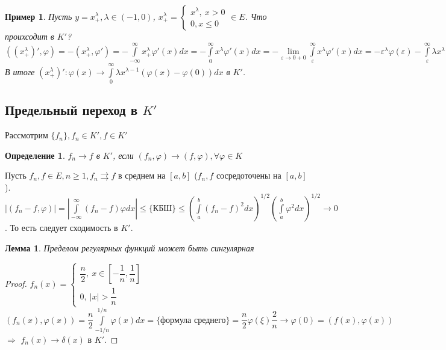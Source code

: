 \documentclass[9pt, a4paper]{article}
\newtheorem*{lemma}{Лемма}
\newtheorem*{definition}{Определение}
\newtheorem*{sample}{Пример}
\begin{document}
			\begin{sample}
				Пусть $y = x_+^\lambda, \lambda \in (-1, 0)$, $x_+^\lambda = \begin{cases}
					x^\lambda, \ x > 0 \\
					0, x \leq 0
				\end{cases}	 \in E $. Что проихсодит в $K'$? \newline
				$((x_+^\lambda)', \varphi) = - (x_+^\lambda, \varphi') = - \int\limits_{-\infty}^{\infty} x_+^\lambda \varphi'(x) dx = - \int\limits_0^\infty x^\lambda \varphi'(x) dx = -\lim\limits_{\varepsilon \to 0 +0} \int\limits_{\varepsilon}^{\infty} x^\lambda \varphi'(x) dx =  -\varepsilon^\lambda \varphi(\varepsilon) - \int\limits_{\varepsilon}^{\infty} \lambda x^{\lambda -1} \varphi(x) dx =  -\varepsilon^\lambda \varphi(\varepsilon) - \int\limits_{\varepsilon}^{\infty} \lambda x^{\lambda -1} (\varphi(x) - \varphi(0)) dx - \int\limits_{\varepsilon}^{\infty} \lambda x^{\lambda -1} \varphi(0) dx = \varepsilon^\lambda (\varphi(0) - \varphi(\varepsilon)) - \int\limits_{\varepsilon}^{\infty} \lambda x^{\lambda -1} (\varphi(x) - \varphi(0))dx \to - \int\limits_0^\infty \lambda x^{\lambda -1} (\varphi(x) - \varphi(0))dx$\newline
				В итоге $(x_+^\lambda)': \varphi(x) \to \int\limits_0^\infty \lambda x^{\lambda -1} (\varphi(x) - \varphi(0))dx$ в $K'$.
			\end{sample}
		\subsection*{Предельный переход в $K'$}
			Рассмотрим $\{f_n\}, f_n \in K', f \in K'$
			\begin{definition}
				$f_n \to f$ в  $K'$, если $(f_n, \varphi) \to (f, \varphi), \forall \varphi \in K$
			\end{definition}
			Пусть $f_n, f \in E, n \geq 1, f_n \rightrightarrows f$ в среднем на $[a,b]$ ($f_n,f$ сосредоточены на $[a,b]$). $|(f_n-f, \varphi)| = |\int\limits_{-\infty}^{\infty} (f_n-f)\varphi dx | \leq \{\text{КБШ}\} \leq \left(\int\limits_a^b (f_n-f)^2dx\right)^{1/2} \left(\int\limits_a^b \varphi^2 dx\right)^{1/2} \to 0$. То есть следует сходимость в $K'$.
			\begin{lemma}
				Пределом регулярных функций может быть сингулярная		
			\end{lemma}
			\begin{proof}
				$f_n(x) = \begin{cases}
					\dfrac{n}{2}, \ x \in [-\dfrac{1}{n}, \dfrac{1}{n}]\\
					0, \ |x| > \dfrac{1}{n}
				\end{cases}$\newline
				$(f_n(x), \varphi(x)) = \dfrac{n}{2} \int\limits_{-1/n}^{1/n} \varphi(x)dx = \{\text{формула среднего}\} = \dfrac{n}{2} \varphi(\xi) \dfrac{2}{n} \to \varphi(0) = (f(x), \varphi(x)) $ $\Rightarrow$  $f_n(x) \to \delta(x)$ в $K'$.
			\end{proof}
\end{document}
